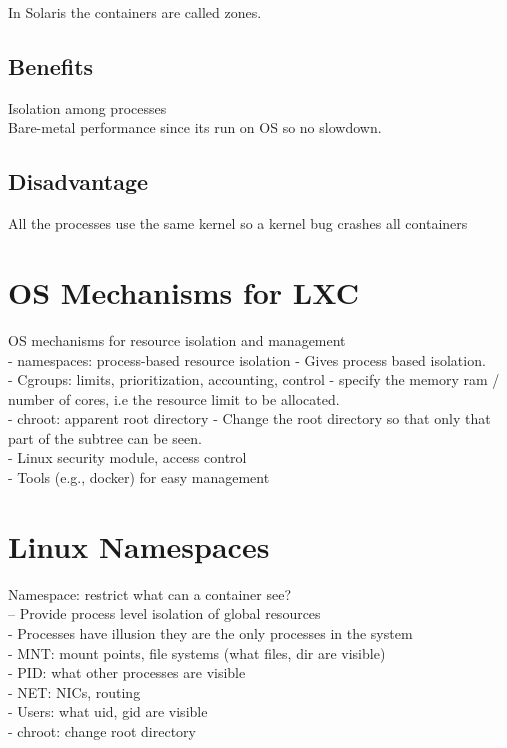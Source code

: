 \documentclass[twoside]{article}
\begin{document}
In Solaris the containers are called zones.

\subsection{Benefits}

Isolation among processes\\
Bare-metal performance since its run on OS so no slowdown.

\subsection{Disadvantage}

All the processes use the same kernel so a kernel bug crashes all containers

\section{OS Mechanisms for LXC}
 OS mechanisms for resource isolation and management \\
- namespaces: process-based resource isolation  -  Gives process based isolation.\\
- Cgroups: limits, prioritization, accounting, control - specify the memory ram / number of cores, i.e the resource limit to be allocated.\\
- chroot: apparent root directory  -  Change the root directory so that only that part of the subtree can be seen.\\
- Linux security module, access control\\
- Tools (e.g., docker) for easy management\\

\section{Linux Namespaces}

Namespace: restrict what can a container see?\\
– Provide process level isolation of global resources\\
- Processes have illusion they are the only processes in
the system\\
- MNT: mount points, file systems (what files, dir are
visible)\\
- PID: what other processes are visible\\
- NET: NICs, routing\\
- Users: what uid, gid are visible\\
- chroot: change root directory
\end{document}
